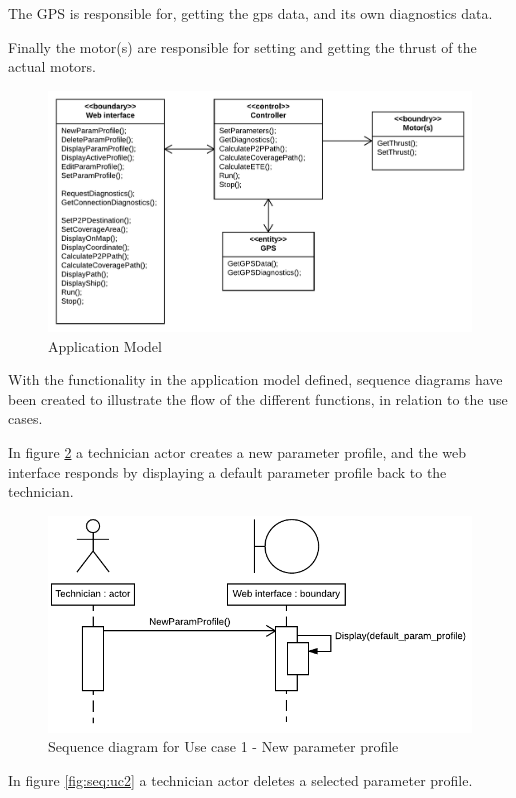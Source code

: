 The GPS is responsible for, getting the gps data, and its own diagnostics data.

Finally the motor(s) are responsible for setting and getting the thrust of the actual motors.

\begin{figure}[H]
	\centering
	\includegraphics[width=1\linewidth]{Images/System_architecture/Application_Model}
	\caption{Application Model}
	\label{fig:appliction_model}
\end{figure}

With the functionality in the application model defined, sequence diagrams have been created to illustrate the flow of the different functions, in relation to the use cases.

In figure \ref{fig:seq:uc1} a technician actor creates a new parameter profile, and the web interface responds by displaying a default parameter profile back to the technician.

\begin{figure}[H]
	\centering
	\includegraphics[width=0.8\linewidth]{Images/System_architecture/Use_case_1_SD}
	\caption{Sequence diagram for Use case 1 - New parameter profile}
	\label{fig:seq:uc1}
\end{figure}

In figure \ref{fig:seq:uc2} a technician actor deletes a selected parameter profile.

